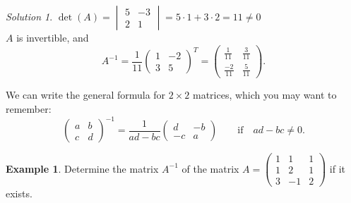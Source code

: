 \documentclass[
  english,
  12pt,
  oneside]{book}
\theoremstyle{definition}
\theoremstyle{definition}
\newtheorem{example}{Example}[chapter]
\theoremstyle{definition}
\theoremstyle{definition}
\theoremstyle{remark}
\newtheorem*{solution}{Solution}
\begin{document}
\begin{solution}
\(\det(A)=\begin{vmatrix}5&-3\\2&1\end{vmatrix}=5\cdot1+3\cdot2=11\neq0\)\\
\(A\) is invertible, and
\[A^{-1} = \frac{1}{11}\begin{pmatrix}1&-2\\3&5\end{pmatrix}^T
= \begin{pmatrix}\frac{1}{11}&\frac{3}{11}\\\frac{-2}{11}&\frac{5}{11}\end{pmatrix}.\]
\end{solution}

We can write the general formula for \(2\times 2\) matrices, which you may want to remember:
\[\begin{pmatrix}a&b\\c&d\end{pmatrix}^{-1} = \frac{1}{ad-bc} \begin{pmatrix}d&-b\\-c&a\end{pmatrix}\quad\quad
\text{if}\quad ad-bc\neq0.\]

\begin{example}
Determine the matrix \(A^{-1}\) of the matrix \(A=\begin{pmatrix}1&1&1\\1&2&1\\3&-1&2\end{pmatrix}\) if it exists.
\end{example}
\end{document}
